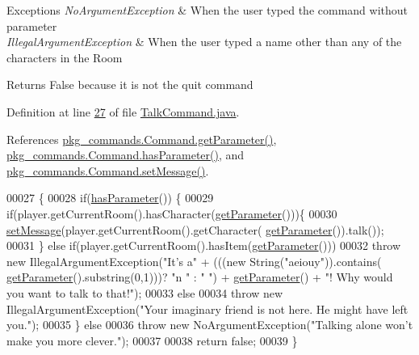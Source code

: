 \begin{DoxyExceptions}{Exceptions}
{\em No\-Argument\-Exception} & When the user typed the command without parameter \\
\hline
{\em Illegal\-Argument\-Exception} & When the user typed a name other than any of the characters in the Room \\
\hline
\end{DoxyExceptions}
\begin{DoxyReturn}{Returns}
False because it is not the quit command 
\end{DoxyReturn}


Definition at line \hyperlink{TalkCommand_8java_source_l00027}{27} of file \hyperlink{TalkCommand_8java_source}{Talk\-Command.\-java}.



References \hyperlink{Command_8java_source_l00041}{pkg\-\_\-commands.\-Command.\-get\-Parameter()}, \hyperlink{Command_8java_source_l00073}{pkg\-\_\-commands.\-Command.\-has\-Parameter()}, and \hyperlink{Command_8java_source_l00089}{pkg\-\_\-commands.\-Command.\-set\-Message()}.


\begin{DoxyCode}
00027                                                                                               \{
00028         \textcolor{keywordflow}{if}(\hyperlink{classpkg__commands_1_1Command_a02af95ab3f1898a66259ab7c177b6998}{hasParameter}()) \{
00029             \textcolor{keywordflow}{if}(player.getCurrentRoom().hasCharacter(\hyperlink{classpkg__commands_1_1Command_a41c92d445be73ea9d62320c65efb8434}{getParameter}()))\{
00030                 \hyperlink{classpkg__commands_1_1Command_ae210ff216fe908b111ba1c988a963d13}{setMessage}(player.getCurrentRoom().getCharacter(
      \hyperlink{classpkg__commands_1_1Command_a41c92d445be73ea9d62320c65efb8434}{getParameter}()).talk());
00031             \} \textcolor{keywordflow}{else} \textcolor{keywordflow}{if}(player.getCurrentRoom().hasItem(\hyperlink{classpkg__commands_1_1Command_a41c92d445be73ea9d62320c65efb8434}{getParameter}()))
00032                 \textcolor{keywordflow}{throw} \textcolor{keyword}{new} IllegalArgumentException(\textcolor{stringliteral}{"It's a"} + (((\textcolor{keyword}{new} String(\textcolor{stringliteral}{"aeiouy"})).contains(
      \hyperlink{classpkg__commands_1_1Command_a41c92d445be73ea9d62320c65efb8434}{getParameter}().substring(0,1)))? \textcolor{stringliteral}{"n "} : \textcolor{stringliteral}{" "}) + \hyperlink{classpkg__commands_1_1Command_a41c92d445be73ea9d62320c65efb8434}{getParameter}() + \textcolor{stringliteral}{"! Why would you
       want to talk to that!"});
00033             \textcolor{keywordflow}{else}
00034                 \textcolor{keywordflow}{throw} \textcolor{keyword}{new} IllegalArgumentException(\textcolor{stringliteral}{"Your imaginary friend is not here. He might have left
       you."});
00035         \} \textcolor{keywordflow}{else}
00036             \textcolor{keywordflow}{throw} \textcolor{keyword}{new} NoArgumentException(\textcolor{stringliteral}{"Talking alone won't make you more clever."});
00037 
00038         \textcolor{keywordflow}{return} \textcolor{keyword}{false};
00039     \}
\end{DoxyCode}



